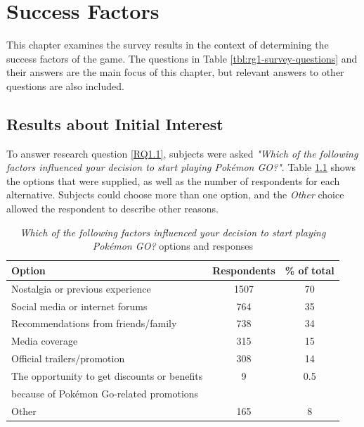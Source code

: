 
\chapter{Success Factors}
\label{chapter:player-study-success-factors}

This chapter examines the survey results in the context of determining the success factors of the game. The questions in Table \ref{tbl:rg1-survey-questions} and their answers are the main focus of this chapter, but relevant answers to other questions are also included.

\section{Results about Initial Interest}
\label{sec:success-factors-initial-interest-results}

To answer research question \ref{RQ1.1}, subjects were asked \emph{"Which of the following factors influenced your decision to start playing Pokémon GO?"}. Table \ref{tbl:initial-interest-options} shows the options that were supplied, as well as the number of respondents for each alternative. Subjects could choose more than one option, and the \emph{Other} choice allowed the respondent to describe other reasons.

\begin{table}[h]
	\caption{\emph{Which of the following factors influenced your decision to start playing Pokémon GO?} options and responses}
	\centering
	\label{tbl:initial-interest-options}
	\begin{tabular}{|l|c|c|}
		\hline
		\textbf{Option} & \textbf{Respondents} & \textbf{\% of total}\\
		\hline\hline
		Nostalgia or previous experience & 1507 & 70\\\hline
		Social media or internet forums & 764 & 35\\\hline
		Recommendations from friends/family & 738 & 34\\\hline
		Media coverage & 315 & 15\\\hline
		Official trailers/promotion & 308 & 14\\\hline
		The opportunity to get discounts or benefits & 9 & 0.5\\ because of Pokémon Go-related promotions && \\\hline
		Other & 165 & 8\\\hline
	\end{tabular}
\end{table}

